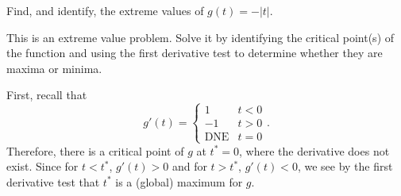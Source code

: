 \documentclass{ximera}
\author{Emma Smith Zbarsky}
\begin{document}
\begin{exercise}

Find, and identify, the extreme values of $g(t) = -|t|$.


\begin{hint}
This is an extreme value problem. Solve it by identifying the critical
point(s) of the function and using the first derivative test to
determine whether they are maxima or minima.
\end{hint}


\begin{hint}
First, recall that \[g'(t) = \begin{cases} 1 & t < 0 \\ -1 & t > 0 \\
\mbox{DNE} & t=0 \end{cases}.\] Therefore, there is a critical point of
$g$ at $t^*=0$, where the derivative does not exist. Since for
$t < t^*$, $g'(t) > 0$ and for $t > t^*$, $g'(t) < 0$, we see by the
first derivative test that $t^*$ is a (global) maximum for $g$.
\end{hint}


\begin{multipleChoice}
\end{multipleChoice}

\end{exercise}
\end{document}
